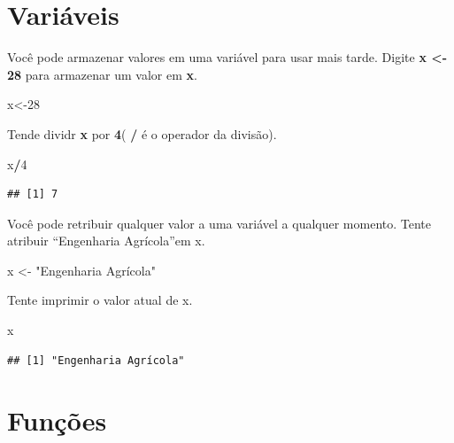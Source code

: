 \documentclass[]{book}
\newenvironment{Shaded}{\begin{snugshade}}{\end{snugshade}}
\newcommand{\DecValTok}[1]{\textcolor[rgb]{0.00,0.00,0.81}{#1}}
\newcommand{\NormalTok}[1]{#1}
\newcommand{\OperatorTok}[1]{\textcolor[rgb]{0.81,0.36,0.00}{\textbf{#1}}}
\newcommand{\StringTok}[1]{\textcolor[rgb]{0.31,0.60,0.02}{#1}}
\begin{document}
\hypertarget{variaveis}{%
\section{Variáveis}\label{variaveis}}

Você pode armazenar valores em uma variável para usar mais tarde.
Digite \textbf{x \textless{}- 28} para armazenar um valor em \textbf{x}.

\begin{Shaded}
\begin{Highlighting}[]
\NormalTok{x<-}\DecValTok{28}
\end{Highlighting}
\end{Shaded}

Tende dividr \textbf{x} por \textbf{4}( \textbf{/} é o operador da divisão).

\begin{Shaded}
\begin{Highlighting}[]
\NormalTok{x}\OperatorTok{/}\DecValTok{4}
\end{Highlighting}
\end{Shaded}

\begin{verbatim}
## [1] 7
\end{verbatim}

Você pode retribuir qualquer valor a uma variável a qualquer momento.
Tente atribuir ``Engenharia Agrícola''em x.

\begin{Shaded}
\begin{Highlighting}[]
\NormalTok{x <-}\StringTok{ "Engenharia Agrícola"}
\end{Highlighting}
\end{Shaded}

Tente imprimir o valor atual de x.

\begin{Shaded}
\begin{Highlighting}[]
\NormalTok{x}
\end{Highlighting}
\end{Shaded}

\begin{verbatim}
## [1] "Engenharia Agrícola"
\end{verbatim}

\hypertarget{funcoes}{%
\section{Funções}\label{funcoes}}
\end{document}
